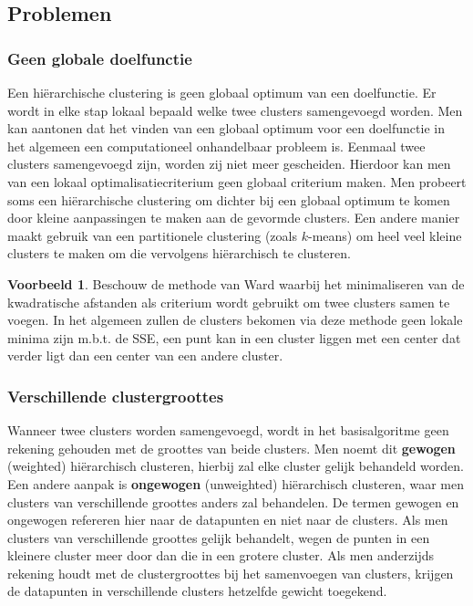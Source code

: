 \documentclass[a4paper,12pt]{article}
\theoremstyle{definition}
\newtheorem{vb}{Voorbeeld}[subsection]
\begin{document}
\subsection{Problemen}
\subsubsection{Geen globale doelfunctie}
Een hiërarchische clustering is geen globaal optimum van een doelfunctie. Er wordt
in elke stap lokaal bepaald welke twee clusters samengevoegd worden. Men kan
aantonen dat het vinden van een globaal optimum voor een doelfunctie in het algemeen 
een computationeel onhandelbaar probleem is.
Eenmaal twee clusters samengevoegd zijn, worden zij niet meer gescheiden. Hierdoor
kan men van een lokaal optimalisatiecriterium
geen globaal criterium maken. Men probeert soms een hiërarchische clustering om
dichter bij een globaal optimum te komen door kleine aanpassingen te maken aan de
gevormde clusters. Een andere manier maakt gebruik van een partitionele clustering
(zoals $k$-means) om heel veel kleine clusters te maken om die vervolgens 
hiërarchisch te clusteren.

\begin{vb}
Beschouw de methode van Ward waarbij het minimaliseren van de kwadrati\-sche
afstanden als criterium wordt gebruikt om twee clusters samen te voegen. In het
algemeen zullen de clusters bekomen via deze methode geen lokale minima zijn m.b.t. de SSE, een punt kan in
een cluster liggen met een center dat verder ligt dan een center van een andere
cluster.
\end{vb}

\subsubsection{Verschillende clustergroottes}
Wanneer twee clusters worden samengevoegd, wordt in het basisalgoritme geen
rekening gehouden met de groottes van beide clusters. Men noemt dit
\textbf{gewogen} (weighted) hiërarchisch clusteren, hierbij zal elke cluster
gelijk behandeld worden. Een andere aanpak is \textbf{ongewogen} (unweighted)
hiërarchisch clusteren, waar men clusters van verschillende groottes anders zal
behandelen. De termen gewogen en ongewogen refereren hier naar de datapunten en niet naar
de clusters. Als men clusters van verschillende groottes gelijk behandelt, wegen
de punten in een kleinere cluster meer door dan die in een grotere cluster.
Als men anderzijds rekening houdt met de clustergroottes bij het samenvoegen van
clusters, krijgen de datapunten in verschillende clusters hetzelfde gewicht
toegekend.
\end{document}
